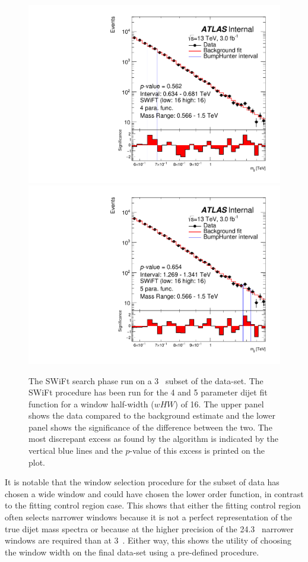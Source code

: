 \begin{figure}[!htb]
\captionsetup[subfigure]{aboveskip=0pt,justification=centering}
\centering
{} {
  \includegraphics[width=0.45\linewidth, angle=0]{figs/Dibjet/LowMass/FitStudy_min566/bhFit_subset_4para_low16_high16.pdf}
}
 {
  \includegraphics[width=0.45\linewidth, angle=0]{figs/Dibjet/LowMass/FitStudy_min566/bhFit_subset_5para_low16_high16.pdf}
}

\caption{\label{fig:bhFit_lm_subset}
  The SWiFt search phase run on a 3~\ifb{} subset of the \lm{} data-set.
  The SWiFt procedure has been run for the 4 and 5 parameter dijet fit function for a window half-width ($wHW$) of 16.
  The upper panel shows the data compared to the background estimate and the lower panel shows the significance of the difference between the two.
  The most discrepant excess as found by the \bh{} algorithm is indicated by the vertical blue lines and the \mbox{$p$-value} of this excess is printed on the plot. }
\end{figure}

It is notable that the window selection procedure for the subset of data has chosen a wide window and
could have chosen the lower order function, in contrast to the fitting control region case. 
This shows that either the fitting control region often selects narrower windows
because it is not a perfect representation of the true dijet mass spectra
or because at the higher precision of the 24.3~\ifb{} narrower windows are required than at 3~\ifb{}.
Either way, this shows the utility of choosing the window width on the final data-set using a pre-defined procedure.

